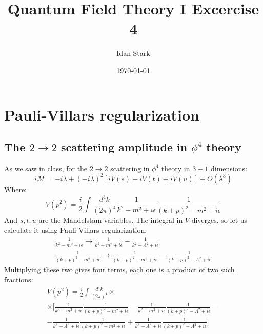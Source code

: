 \documentclass{article}
\title{Quantum Field Theory I Excercise 4}
\author{Idan Stark}
\date{\today}
\begin{document}
\maketitle

\section{Pauli-Villars regularization}
\subsection{The $2 \rightarrow 2$ scattering amplitude in $\phi^4$ theory}
As we saw in class, for the $2 \rightarrow 2$ scattering in $\phi^4$ theory in $3 + 1$ dimensions:
\begin{equation}
    i\mathcal{M} = -i\lambda + (-i\lambda)^2\left[iV(s) + iV(t) + iV(u)\right] + O(\lambda^3)
\end{equation}
Where:
\begin{equation}
    V\left(p^2\right) = \frac{i}{2}\int \frac{d^4k}{(2\pi)^4}\frac{1}{k^2 - m^2 + i\epsilon}\frac{1}{(k + p)^2 - m^2 + i\epsilon}
\end{equation}
And $s, t, u$ are the Mandelstam variables. The integral in $V$ diverges, so let us calculate it using Pauli-Villars regularization:
\begin{equation}
\begin{gathered}
    \frac{1}{k^2 - m^2 + i\epsilon} \rightarrow \frac{1}{k^2 - m^2 + i\epsilon} - \frac{1}{k^2 - \Lambda^2 + i\epsilon}
    \\
    \frac{1}{(k + p)^2 - m^2 + i\epsilon} \rightarrow \frac{1}{(k + p)^2 - m^2 + i\epsilon} - \frac{1}{(k + p)^2 - \Lambda^2 + i\epsilon}
\end{gathered}
\end{equation}
Multiplying these two gives four terms, each one is a product of two such fractions:
\begin{equation}
\begin{gathered}
    V\left(p^2\right) = \frac{i}{2}\int \frac{d^4k}{(2\pi)^4} \times \\ \times \Bigg[
        \frac{1}{k^2 - m^2 + i\epsilon}\frac{1}{(k + p)^2 - m^2 + i\epsilon} -
        \frac{1}{k^2 - m^2 + i\epsilon}\frac{1}{(k + p)^2 - \Lambda^2 + i\epsilon} - \\ -
        \frac{1}{k^2 - \Lambda^2 + i\epsilon}\frac{1}{(k + p)^2 - m^2 + i\epsilon} +
        \frac{1}{k^2 - \Lambda^2 + i\epsilon}\frac{1}{(k + p)^2 - \Lambda^2 + i\epsilon}
    \Bigg]
\end{gathered}
\end{equation}
\end{document}
